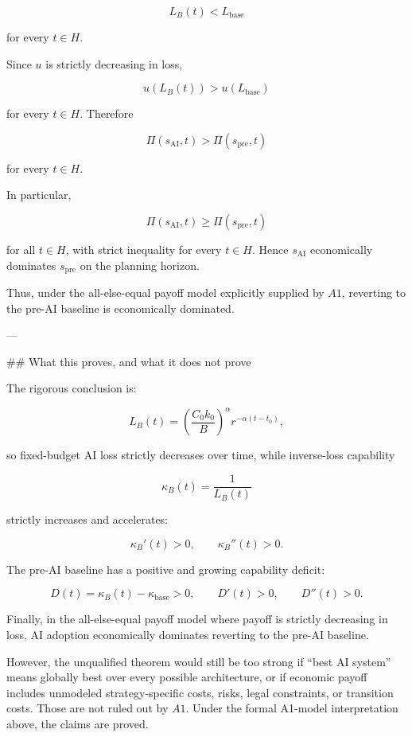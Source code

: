 \[
L_B(t)<L_{\mathrm{base}}
\]

for every \(t\in H\).

Since \(u\) is strictly decreasing in loss,

\[
u(L_B(t))>u(L_{\mathrm{base}})
\]

for every \(t\in H\). Therefore

\[
\Pi(s_{\mathrm{AI}},t)>\Pi(s_{\mathrm{pre}},t)
\]

for every \(t\in H\).

In particular,

\[
\Pi(s_{\mathrm{AI}},t)\geq \Pi(s_{\mathrm{pre}},t)
\]

for all \(t\in H\), with strict inequality for every \(t\in H\). Hence \(s_{\mathrm{AI}}\) economically dominates \(s_{\mathrm{pre}}\) on the planning horizon.

Thus, under the all-else-equal payoff model explicitly supplied by \(A1\), reverting to the pre-AI baseline is economically dominated.

---

## What this proves, and what it does not prove

The rigorous conclusion is:

\[
L_B(t)=
\left(\frac{C_0k_0}{B}\right)^\alpha r^{-\alpha(t-t_0)},
\]

so fixed-budget AI loss strictly decreases over time, while inverse-loss capability

\[
\kappa_B(t)=\frac{1}{L_B(t)}
\]

strictly increases and accelerates:

\[
\kappa_B'(t)>0,
\qquad
\kappa_B''(t)>0.
\]

The pre-AI baseline has a positive and growing capability deficit:

\[
D(t)=\kappa_B(t)-\kappa_{\mathrm{base}}>0,
\qquad
D'(t)>0,
\qquad
D''(t)>0.
\]

Finally, in the all-else-equal payoff model where payoff is strictly decreasing in loss, AI adoption economically dominates reverting to the pre-AI baseline.

However, the unqualified theorem would still be too strong if “best AI system” means globally best over every possible architecture, or if economic payoff includes unmodeled strategy-specific costs, risks, legal constraints, or transition costs. Those are not ruled out by \(A1\). Under the formal A1-model interpretation above, the claims are proved.